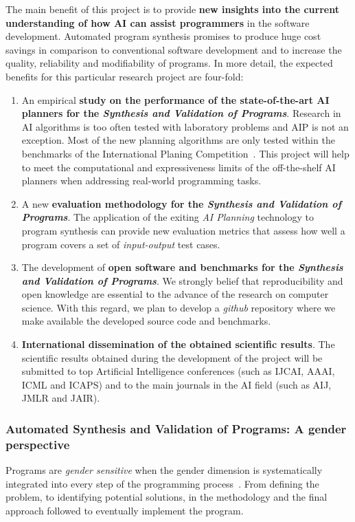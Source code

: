 \documentclass[10pt,a4paper]{paper}
\begin{document}
The main benefit of this project is to provide {\bf new insights into the current understanding of how AI can assist programmers} in the software development.  Automated program synthesis promises to produce huge cost savings in comparison to conventional software development and to increase the quality, reliability and modifiability of programs.  In more detail, the expected benefits for this particular research project are four-fold:
\begin{enumerate}
\item An empirical {\bf study on the performance of the state-of-the-art AI planners for the {\em Synthesis and Validation of Programs}}. Research in AI algorithms is too often tested with laboratory problems and AIP is not an exception. Most of the new planning algorithms are only tested within the benchmarks of the International Planing Competition~\cite{vallati:IPC:AI15}. This project will help to meet the computational and expressiveness limits of the off-the-shelf AI planners when addressing real-world programming tasks. 
\item A new {\bf evaluation methodology for the {\em Synthesis and Validation of Programs}}. The application of the exiting {\em AI Planning} technology to program synthesis can provide new evaluation metrics that assess how well a program covers a set of {\em input-output} test cases.  
\item The development of {\bf open software and benchmarks for the {\em Synthesis and Validation of Programs}}. We strongly belief that reproducibility and open knowledge are essential to the advance of the research on computer science. With this regard, we plan to develop a {\em github} repository where we make available the developed source code and benchmarks.
\item {\bf International dissemination of the obtained scientific results}. The scientific results obtained during the development of the project will be submitted to top Artificial Intelligence conferences (such as IJCAI, AAAI, ICML and ICAPS) and to the main journals in the AI field (such as AIJ, JMLR and JAIR).
\end{enumerate}

\subsubsection*{Automated Synthesis and Validation of Programs: A gender perspective}
Programs are {\em gender sensitive} when the gender dimension is systematically integrated into every step of the programming process~\cite{leduc2009guidelines}. From defining the problem, to identifying potential solutions, in the methodology and the final approach followed to eventually implement the program. 
\end{document}
